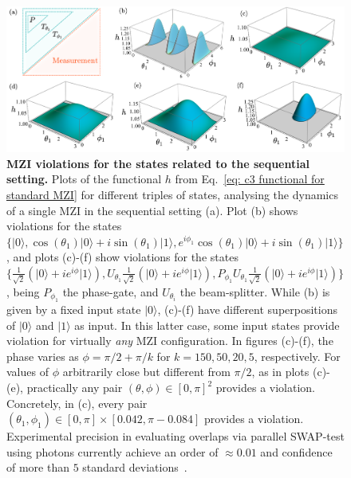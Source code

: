 \documentclass[a4paper,twocolumn,11pt,accepted=2024-01-17]{quantumarticle}
\begin{document}
\begin{figure}[ht]
    \includegraphics[width=1\textwidth]{Acc_Figures/doubleMZIgeneralC3andmore.png}
    \caption{\textbf{MZI violations for the states related to the sequential setting.} Plots of the functional $h$ from Eq.~\eqref{eq: c3 functional for standard MZI} for different triples of states, analysing the dynamics of a single MZI in the sequential setting (a). Plot (b) shows violations for the states    $\{\vert 0 \rangle, \cos(\theta_1)\vert 0\rangle + i\sin(\theta_1)\vert 1\rangle, e^{i\phi_1}\cos(\theta_1)\vert 0\rangle + i\sin(\theta_1)\vert 1\rangle\}$, and plots (c)-(f) show violations for the states $\{\frac{1}{\sqrt{2}}(\vert 0\rangle +ie^{i\phi}\vert 1\rangle), U_{\theta_1}\frac{1}{\sqrt{2}}(\vert 0\rangle +ie^{i\phi}\vert 1\rangle), P_{\phi_1}U_{\theta_1}\frac{1}{\sqrt{2}}(\vert 0\rangle +ie^{i\phi}\vert 1\rangle)\}$, being $P_{\phi_1}$ the phase-gate, and $U_{\theta_i}$ the beam-splitter. While (b) is given by a fixed input state $\vert 0 \rangle$, (c)-(f) have different superpositions of $\vert 0 \rangle$ and $\vert 1 \rangle$ as input. In this latter case, some input states provide violation for virtually \textit{any} MZI configuration. In figures (c)-(f), the phase varies as $\phi = \pi/2 + \pi/k$ for $k=150,50,20,5$, respectively. For values of $\phi$ arbitrarily close but different from $\pi/2$, as in plots (c)-(e), practically any pair $(\theta,\phi) \in [0,\pi]^2$ provides a violation. { Concretely, in (c), every pair $(\theta_1,\phi_1) \in [0,\pi]\times [0.042,\pi-0.084]$ provides a violation.} Experimental precision in evaluating overlaps via parallel SWAP-test using photons currently achieve an order of $\approx 0.01$ and confidence of more than $5$ standard deviations~\cite{giordani2021witnessesofcoherence}. }
    \label{fig: violations for any theta and phi}
\end{figure}
\end{document}
